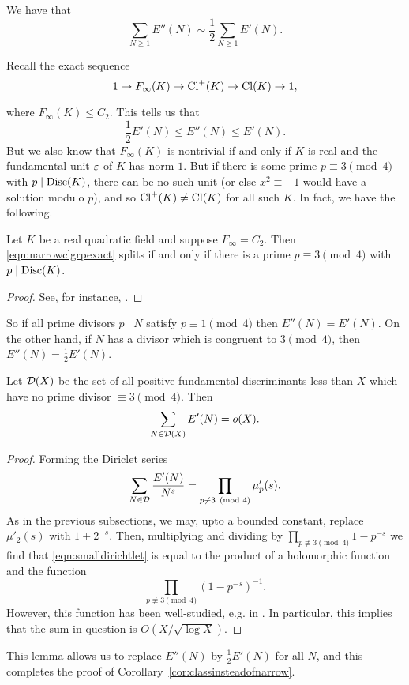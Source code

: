 \begin{cor}\label{cor:classinsteadofnarrow}
  We have that
  \[ \sum_{N \geq 1} E''(N) \sim \frac{1}{2} \sum_{N \geq 1} E'(N). \]
\end{cor}

Recall the exact sequence
\begin{equation}\label{eqn:narrowclgrpexact}
1 \to F_\infty(K) \to \operatorname{Cl}^+(K) \to \operatorname{Cl}(K) \to 1,
\end{equation}

where $F_\infty(K) \leq C_2$.  This tells us that \[ \frac{1}{2} E'(N) \leq
E''(N) \leq E'(N). \]  But we also know that $F_\infty(K)$ is nontrivial if and
only if $K$ is real and the fundamental unit $\varepsilon$ of $K$ has norm $1$.  But
if there is some prime $p \equiv 3 \pmod{4}$ with $p \mid \operatorname{Disc}(K)$, there can
be no such unit (or else $x^2 \equiv -1$ would have a solution modulo $p$), and
so $\operatorname{Cl}^+(K) \ne \operatorname{Cl}(K)$ for all such $K$. In fact, we have the following.

\begin{lem}\label{lem:splitcl2}
  Let $K$ be a real quadratic field and suppose $F_\infty = C_2$. Then
\eqref{eqn:narrowclgrpexact} splits if and only if there is a prime $p \equiv 3
\pmod{4}$ with $p \mid \operatorname{Disc}(K)$.
\end{lem}
\begin{proof}
  See, for instance, \cite[Th\'eor\`eme 8]{LouboutinThreeModFour}.
\end{proof}

So if all prime divisors $p \mid N$ satisfy $p \equiv 1 \pmod{4}$ then $E''(N)
= E'(N)$. On the other hand, if $N$ has a divisor which is congruent to $3
\pmod{4}$, then $E''(N) = \frac{1}{2} E'(N)$.

\begin{lem}
  Let $\mathcal{D}(X)$ be the set of all positive fundamental discriminants less than
$X$ which have no prime divisor $\equiv 3 \pmod{4}$. Then
  \[ \sum_{N \in \mathcal{D}(X)} E'(N) = o(X). \]
\end{lem}
\begin{proof}
  Forming the Diriclet series
  \begin{equation}\label{eqn:smalldirichtlet}
  \sum_{N \in \mathcal{D}} \frac{E'(N)}{N^s} = \prod_{p \not\equiv 3 \pmod{4}} \mu'_p(s).
  \end{equation}
  As in the previous subsections, we may, upto a bounded constant, replace
$\mu'_2(s)$ with $1 + 2^{-s}$. Then, multiplying and dividing by $\prod_{p
\not\equiv 3 \pmod{4}} 1 - p^{-s}$ we find that \eqref{eqn:smalldirichtlet} is
equal to the product of a holomorphic function and the function \[ \prod_{p
\not\equiv 3 \pmod{4}} \left(1 - p^{-s}\right)^{-1}. \] However, this function
has been well-studied, e.g. in \cite[Satz 3]{RiegerNegPell}.  In particular,
this implies that the sum in question is $O(X/\sqrt{\log X})$.
\end{proof}

This lemma allows us to replace $E''(N)$ by $\frac{1}{2}E'(N)$ for all $N$, and
this completes the proof of Corollary~\ref{cor:classinsteadofnarrow}.
